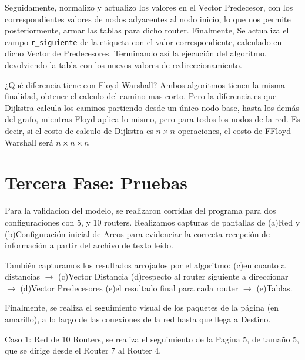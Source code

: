 \documentclass[12pt]{article} %
\begin{document}
Seguidamente, normalizo y actualizo los valores en el Vector Predecesor, con los correspondientes valores de nodos adyacentes al nodo inicio, lo que nos permite posteriormente, armar las tablas para dicho router.
Finalmente, Se actualiza el campo \verb+r_siguiente+ de la etiqueta con el valor correspondiente,  calculado en dicho Vector de Predecesores. Terminando así la ejecución del algoritmo, devolviendo la tabla con los nuevos valores de redireccionamiento.
 
¿Qué diferencia tiene con Floyd-Warshall? Ambos algoritmos tienen la misma finalidad, obtener el calculo del camino mas corto. Pero la diferencia es que Dijkstra calcula los caminos partiendo desde un único nodo base, hasta los demás del grafo, mientras Floyd aplica lo mismo, pero para todos los nodos de la red.
Es decir, si el costo de calculo de Dijkstra es $n \times n$  operaciones, el costo de FFloyd-Warshall será $n \times n \times n$
\section{Tercera Fase: Pruebas}
Para la validacion del modelo, se realizaron corridas del programa para dos configuraciones con 5,  y 10 routers.
Realizamos capturas de pantallas de (a)Red y (b)Configuración inicial de Arcos para evidenciar la correcta recepción de información a partir del archivo de texto leído.

También capturamos los resultados arrojados por el algoritmo:
(c)en cuanto a distancias $\rightarrow$ (c)Vector Distancia
(d)respecto al router siguiente a direccionar $\rightarrow$ (d)Vector Predecesores
(e)el resultado final para cada router $\rightarrow$ (e)Tablas.

Finalmente, se realiza el seguimiento visual de los paquetes de la página (en amarillo), a lo largo de las conexiones de la red hasta que llega a Destino.

Caso 1: Red de 10 Routers, se realiza el seguimiento de la Pagina 5, de tamaño 5, que se dirige desde el Router 7 al Router 4.
\end{document}
